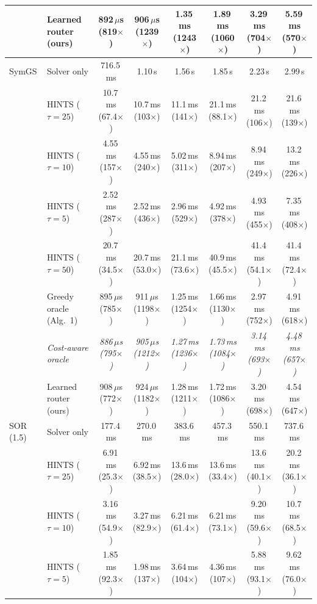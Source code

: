 {\begin{tabular}{llcccccc}
 & Learned router (ours) & 892\,$\mu$s (819$\times$) & 906\,$\mu$s (1239$\times$) & 1.35\,ms (1243$\times$) & 1.89\,ms (1060$\times$) & 3.29\,ms (704$\times$) & 5.59\,ms (570$\times$) \\
\midrule
SymGS & Solver only & 716.5\,ms & 1.10\,s & 1.56\,s & 1.85\,s & 2.23\,s & 2.99\,s \\
 & HINTS ($\tau{=}25$) & 10.7\,ms (67.4$\times$) & 10.7\,ms (103$\times$) & 11.1\,ms (141$\times$) & 21.1\,ms (88.1$\times$) & 21.2\,ms (106$\times$) & 21.6\,ms (139$\times$) \\
 & HINTS ($\tau{=}10$) & 4.55\,ms (157$\times$) & 4.55\,ms (240$\times$) & 5.02\,ms (311$\times$) & 8.94\,ms (207$\times$) & 8.94\,ms (249$\times$) & 13.2\,ms (226$\times$) \\
 & HINTS ($\tau{=}5$) & 2.52\,ms (287$\times$) & 2.52\,ms (436$\times$) & 2.96\,ms (529$\times$) & 4.92\,ms (378$\times$) & 4.93\,ms (455$\times$) & 7.35\,ms (408$\times$) \\
 & HINTS ($\tau{=}50$) & 20.7\,ms (34.5$\times$) & 20.7\,ms (53.0$\times$) & 21.1\,ms (73.6$\times$) & 40.9\,ms (45.5$\times$) & 41.4\,ms (54.1$\times$) & 41.4\,ms (72.4$\times$) \\
 & Greedy oracle (Alg.~1) & 895\,$\mu$s (785$\times$) & 911\,$\mu$s (1198$\times$) & 1.25\,ms (1254$\times$) & 1.66\,ms (1130$\times$) & 2.97\,ms (752$\times$) & 4.91\,ms (618$\times$) \\
 & \textit{Cost-aware oracle} & \textit{886\,$\mu$s (795$\times$)} & \textit{905\,$\mu$s (1212$\times$)} & \textit{1.27\,ms (1236$\times$)} & \textit{1.73\,ms (1084$\times$)} & \textit{3.14\,ms (693$\times$)} & \textit{4.48\,ms (657$\times$)} \\
 & Learned router (ours) & 908\,$\mu$s (772$\times$) & 924\,$\mu$s (1182$\times$) & 1.28\,ms (1211$\times$) & 1.72\,ms (1086$\times$) & 3.20\,ms (698$\times$) & 4.54\,ms (647$\times$) \\
\midrule
SOR (1.5) & Solver only & 177.4\,ms & 270.0\,ms & 383.6\,ms & 457.3\,ms & 550.1\,ms & 737.6\,ms \\
 & HINTS ($\tau{=}25$) & 6.91\,ms (25.3$\times$) & 6.92\,ms (38.5$\times$) & 13.6\,ms (28.0$\times$) & 13.6\,ms (33.4$\times$) & 13.6\,ms (40.1$\times$) & 20.2\,ms (36.1$\times$) \\
 & HINTS ($\tau{=}10$) & 3.16\,ms (54.9$\times$) & 3.27\,ms (82.9$\times$) & 6.21\,ms (61.4$\times$) & 6.21\,ms (73.1$\times$) & 9.20\,ms (59.6$\times$) & 10.7\,ms (68.5$\times$) \\
 & HINTS ($\tau{=}5$) & 1.85\,ms (92.3$\times$) & 1.98\,ms (137$\times$) & 3.64\,ms (104$\times$) & 4.36\,ms (107$\times$) & 5.88\,ms (93.1$\times$) & 9.62\,ms (76.0$\times$) \\

\end{tabular}}
